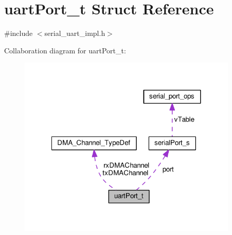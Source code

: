 \hypertarget{structuartPort__t}{\section{uart\+Port\+\_\+t Struct Reference}
\label{structuartPort__t}
}


{\ttfamily \#include $<$serial\+\_\+uart\+\_\+impl.\+h$>$}



Collaboration diagram for uart\+Port\+\_\+t\+:\nopagebreak
\begin{figure}[H]
\begin{center}
\leavevmode
\includegraphics[width=296pt]{structuartPort__t__coll__graph}
\end{center}
\end{figure}
